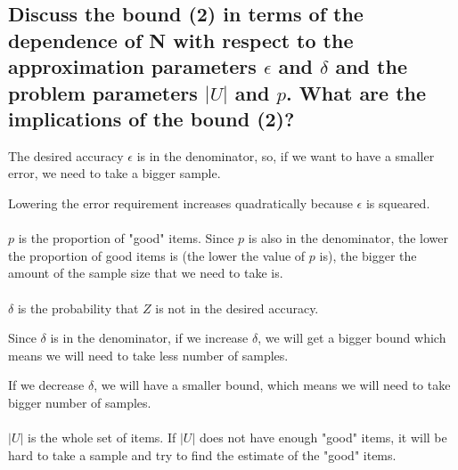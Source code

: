 \documentclass[11pt]{article}
\begin{document}
\subsection{Discuss the bound (2) in terms of the dependence of N with respect to the approximation parameters $\epsilon$ and $\delta$ and the problem parameters $|U|$ and $p$. What are the implications of the bound (2)?}

The desired accuracy $\epsilon$ is in the denominator, so, if we want to have a smaller error, we need to take a bigger sample.

Lowering the error requirement increases quadratically because $\epsilon$ is squeared.
\\~\\
$p$ is the proportion of "good" items. Since $p$ is also in the denominator, the lower the proportion of good items is (the lower the value of $p$ is), the bigger the amount of the sample size that we need to take is. 
\\~\\
$\delta$ is the probability that $Z$ is not in the desired accuracy.

Since $\delta$ is in the denominator, if we increase $\delta$, we will get a bigger bound which means we will need to take less number of samples.

If we decrease $\delta$, we will have a smaller bound, which means we will need to take bigger number of samples.
\\~\\
$|U|$ is the whole set of items. If $|U|$ does not have enough "good" items, it will be hard to take a sample and try to find the estimate of the "good" items.
\end{document}

